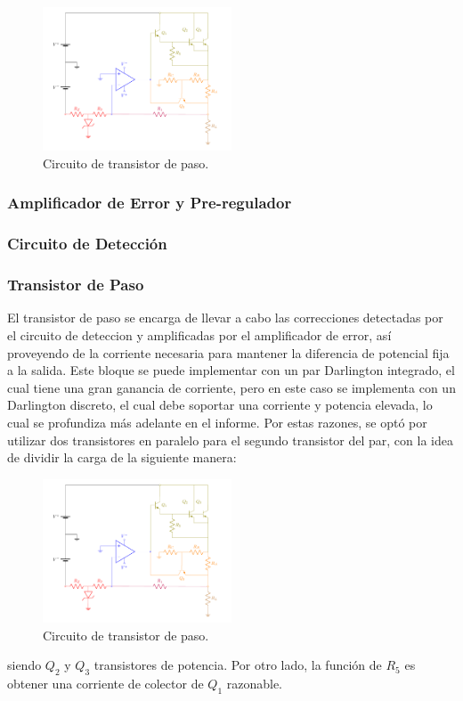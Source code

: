 \begin{figure}[H]
\centering
	\includegraphics[width=0.5\textwidth, page=6]{ImagenesEjercicio2/Regulador.pdf}
	\caption{Circuito de transistor de paso.}
	\label{fig:transistorDePaso}
\end{figure}

\subsubsection{Amplificador de Error y Pre-regulador}
\subsubsection{Circuito de Detección}
\subsubsection{Transistor de Paso}
El transistor de paso se encarga de llevar a cabo las correcciones detectadas por el circuito de deteccion y amplificadas por el amplificador de error, así proveyendo de la corriente necesaria para mantener la diferencia de potencial fija a la salida. Este bloque se puede implementar con un par Darlington integrado, el cual tiene una gran ganancia de corriente, pero en este caso se implementa con un Darlington discreto, el cual debe soportar una corriente y potencia elevada, lo cual se profundiza más adelante en el informe. Por estas razones, se optó por utilizar dos transistores en paralelo para el segundo transistor del par, con la idea de dividir la carga de la siguiente manera:
\begin{figure}[H]
\centering
	\includegraphics[width=0.5\textwidth, page=5]{ImagenesEjercicio2/Regulador.pdf}
	\caption{Circuito de transistor de paso.}
	\label{fig:transistorDePaso}
\end{figure}
siendo $Q_2$ y $Q_3$ transistores de potencia. Por otro lado, la función de $R_5$ es obtener una corriente de colector de $Q_1$ razonable.
